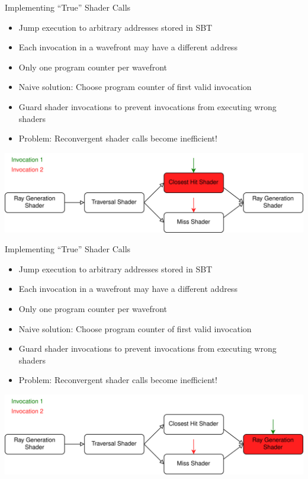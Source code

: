 \documentclass[aspectratio=169,t]{beamer}
\begin{document}
\begin{slide}{Implementing ``True'' Shader Calls}
 \begin{itemize}
  \item Jump execution to arbitrary addresses stored in SBT
  \item Each invocation in a wavefront may have a different address
  \item Only one program counter per wavefront
  \item Naive solution: Choose program counter of first valid invocation
  \item Guard shader invocations to prevent invocations from executing wrong shaders
  \item Problem: Reconvergent shader calls become inefficient!
 \end{itemize}
 \includegraphics[width=\textwidth]{graphics/RTStages2-3.png}
\end{slide}

\begin{slide}{Implementing ``True'' Shader Calls}
 \begin{itemize}
  \item Jump execution to arbitrary addresses stored in SBT
  \item Each invocation in a wavefront may have a different address
  \item Only one program counter per wavefront
  \item Naive solution: Choose program counter of first valid invocation
  \item Guard shader invocations to prevent invocations from executing wrong shaders
  \item Problem: Reconvergent shader calls become inefficient!
 \end{itemize}
 \includegraphics[width=\textwidth]{graphics/RTStages2-4.png}
\end{slide}
\end{document}
